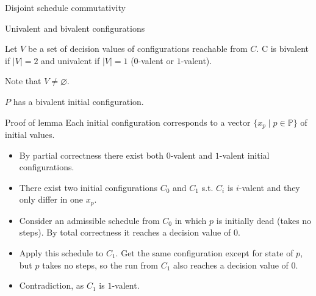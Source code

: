 \documentclass{beamer}
\begin{document}
\begin{frame}{Disjoint schedule commutativity}
  \begin{figure}[!h]
  \centering
  \end{figure}
\end{frame}

\begin{frame}{Univalent and bivalent configurations}
  \begin{definition}
    Let $V$ be a set of decision values of configurations reachable from $C$. C is \alert{bivalent} if $|V| = 2$ and \alert{univalent} if $|V| = 1$ ($0$-valent or $1$-valent).

    Note that $V \ne \varnothing$.
  \end{definition}
  \begin{lemma}
    $P$ has a bivalent initial configuration.
  \end{lemma}
\end{frame}

\begin{frame}{Proof of lemma}
Each initial configuration corresponds to a vector $\{ x_p \mid p \in \mathbb{P} \}$ of initial values.
  \begin{itemize}
    \item By partial correctness there exist both $0$-valent and $1$-valent initial configurations.
    \item There exist two initial configurations $C_0$ and $C_1$ s.t. $C_i$ is $i$-valent and they only differ in one $x_p$.
    \item Consider an admissible schedule from $C_0$ in which $p$ is initially dead (takes no steps). By total correctness it reaches a decision value of $0$.
    \item Apply this schedule to $C_1$. Get the same configuration except for state of $p$, but $p$ takes no steps, so the run from $C_1$ also reaches a decision value of $0$.
    \item Contradiction, as $C_1$ is $1$-valent.
  \end{itemize}
\end{frame}
\end{document}
